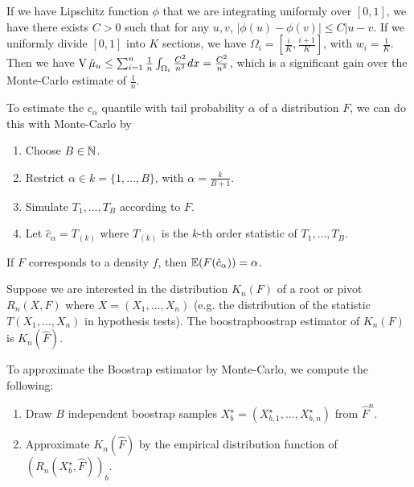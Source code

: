 \begin{thm}
  \label{sec:monte-carlo-method-10}
  If we have Lipschitz function $\phi$ that we are integrating uniformly
  over $[0, 1]$, we have there exists $C > 0$ such that for any $u,
  v$, $|\phi(u) - \phi(v)| \leq C |u - v$.  If we uniformly divide
  $[0, 1]$ into $K$ sections, we have $\Omega_{i} = [\frac{i}{K},
  \frac{i+1}{K}]$, with $w_{i} = \frac{1}{K}$.  Then we have $\operatorname*{V} \hat
  \mu_{u} \leq \sum_{i=1}^{n} \frac{1}{n} \int_{\Omega_{i}}^{}
  \frac{C^{2}}{n^{2}} dx = \frac{C^{2}}{n^{3}}$, which is a significant
  gain over the Monte-Carlo estimate of $\frac{1}{n}$.
\end{thm}


\begin{defn}
  \label{sec:monte-carlo-method-11}
  To estimate the $c_{\alpha}$ quantile with tail probability $\alpha$
  of a distribution $F$, we can do this with Monte-Carlo by
  \begin{enumerate}
  \item Choose $B \in \mathbb{N}$.
  \item Restrict $\alpha \in k = \{ 1, \dots, B \} $, with $\alpha =
    \frac{k}{B+1} $.
  \item Simulate $T_{1}, \dots, T_{B}$ according to $F$.
  \item Let $\hat c_{\alpha} = T_{(k)}$ where $T_{(k)}$ is the $k$-th
    order statistic of $T_{1}, \dots, T_{B}$. 
  \end{enumerate}
\end{defn}

\begin{thm}
  \label{sec:monte-carlo-method-12}
  If $F$ corresponds to a density $f$, then $\E{F(\hat c_{\alpha})} = \alpha$.
\end{thm}

\begin{defn}
  \label{sec:monte-carlo-method-13}
  Suppose we are interested in the distribution $K_{n}(F)$ of a root
  or pivot $R_{n}(X, F)$ where $X  = (X_{1}, \dots, X_{n})$ (e.g. the
  distribution of the statistic $T(X_{1}, \dots, X_{n})$ in hypothesis
  tests).  The boostrapboostrap estimator of $K_{n}(F)$is $K_{n}(\hat F)$.
\end{defn}

\begin{defn}
  \label{sec:monte-carlo-method-14}
  To approximate the Boostrap estimator by Monte-Carlo, we compute the
  following:
  \begin{enumerate}
  \item Draw $B$ independent boostrap samples $X^{\star}_{b} = (X_{b,
      1}^{\star}, \dots, X_{b, n}^{\star})$ from $\hat F^{n}$.
  \item Approximate $K_{n}(\hat F)$ by the empirical distribution
    function of $(R_{n}(X^{\star}_{b}, \hat F))_{b}$.
  \end{enumerate}
\end{defn}


